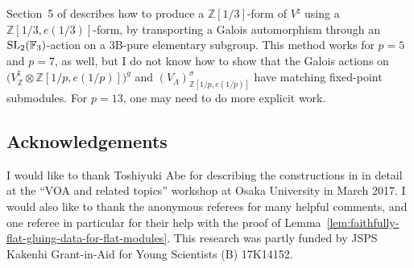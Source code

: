 \documentclass[pdftex]{sigma}
\newcommand{\bF}{\mathbb{F}}
\newcommand{\bZ}{\mathbb{Z}}
\theoremstyle{definition}
\begin{document}
Section~5 of \cite{BR96} describes how to produce a $\bZ[1/3]$-form of $V^\natural$ using a $\bZ[1/3,e(1/3)]$-form, by transporting a Galois automorphism through an ${\rm SL}_2(\bF_3)$-action on a 3B-pure elementary subgroup. This method works for $p=5$ and $p=7$, as well, but I do not know how to show that the Galois actions on $\big(V^\natural_\bZ \otimes \bZ[1/p,e(1/p)]\big)^g$ and $(V_\Lambda)_{\bZ[1/p,e(1/p)]}^\sigma$ have matching fixed-point submodules. For $p=13$, one may need to do more explicit work.

\subsection*{Acknowledgements}
I would like to thank Toshiyuki Abe for describing the constructions in \cite{ALY17} in detail at the ``VOA and related topics'' workshop at Osaka University in March 2017. I would also like to thank the anonymous referees for many helpful comments, and one referee in particular for their help with the proof of Lemma~\ref{lem:faithfully-flat-gluing-data-for-flat-modules}. This research was partly funded by JSPS Kakenhi Grant-in-Aid for Young Scientists (B) 17K14152.
\end{document}
